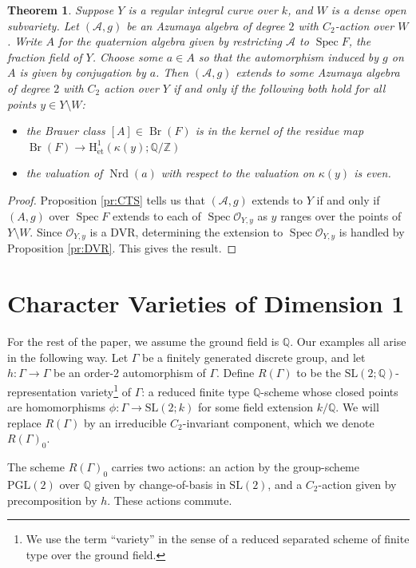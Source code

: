\documentclass[reqno,oneside,dvipsnames,pdfnames,final]{amsart}
\newtheorem{thrm}{Theorem}[section]
\theoremstyle{definition}
\newcommand{\Q}{\mathbb{Q}}
\newcommand{\Z}{\mathbb{Z}}
\DeclareMathOperator{\Spec}{Spec}
\DeclareMathOperator{\Br}{Br}
\newcommand{\SL}{\mathrm{SL}}
\newcommand{\PGL}{\mathrm{PGL}}
\newcommand{\et}{\mathrm{\acute et}}
\newcommand{\sh}[1]{\mathcal{#1}}
\newcommand{\Hoh}{\mathrm{H}}
\newcommand{\Nrd}{\operatorname{Nrd}}
\newcommand{\sm}{\setminus}
\begin{document}
\begin{thrm}\label{th:main}
  Suppose $Y$ is a regular integral curve over $k$, and $W$ is a dense open subvariety. Let $(\mathcal{A}, g)$ be an Azumaya algebra of degree $2$ with $C_2$-action over $W$. Write $A$ for the quaternion algebra given by restricting $\sh A$ to $\Spec F$, the fraction field of $Y$. Choose some $a \in A$ so that the automorphism induced by $g$ on $A$ is given by conjugation by $a$. Then $(\mathcal{A},g)$ extends to some Azumaya algebra of degree $2$ with $C_2$ action over $Y$ if and only if the following both hold for all points $y \in Y \sm W$:
  \begin{itemize}
  \item the Brauer class $[A] \in \Br(F)$ is in the kernel of the residue map $\Br(F) \to \Hoh^1_\et(\kappa(y); \Q/\Z)$
  \item the valuation of $\Nrd(a)$ with respect to the valuation on $\kappa(y)$ is even.
  \end{itemize}
\end{thrm}
\begin{proof}
  Proposition \ref{pr:CTS} tells us that $(\sh A, g)$ extends to $Y$ if and only if $(A,g)$ over $\Spec F$ extends to each of $\Spec \sh O_{Y,y}$ as $y$ ranges over the points of $Y \sm W$. Since $\sh O_{Y,y}$ is a DVR, determining the extension to $\Spec \sh O_{Y,y}$ is handled by Proposition \ref{pr:DVR}. This gives the result.
\end{proof}

\section{Character Varieties of Dimension 1}
\label{sec:examples}

For the rest of the paper, we assume the ground field is $\Q$. Our examples all arise in the following way. Let $\Gamma$ be a finitely generated discrete group, and let $h \colon \Gamma \to \Gamma$ be an order-$2$ automorphism of $\Gamma$. Define $R(\Gamma)$ to be the $\SL(2;\Q)$-representation variety\footnote{We use the term ``variety'' in the sense of a reduced separated scheme of finite type over the ground field.} of $\Gamma$: a reduced finite type $\Q$-scheme whose closed points are homomorphisms $\phi: \Gamma \to \SL(2;k)$ for some field extension $k/\Q$. We will replace $R(\Gamma)$ by an irreducible $C_2$-invariant component, which we denote $R(\Gamma)_0$.

The scheme $R(\Gamma)_0$ carries two actions: an action by the group-scheme $\PGL(2)$ over $\Q$ given by change-of-basis in $\SL(2)$, and a $C_2$-action given by precomposition by $h$. These actions commute.
\end{document}
